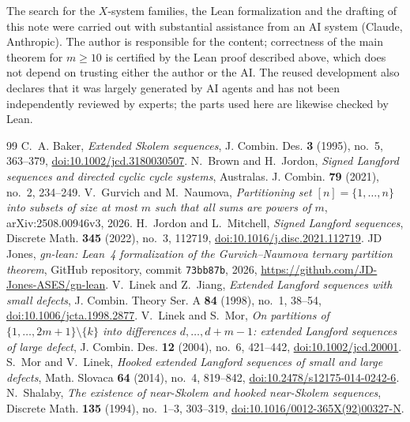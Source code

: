 \documentclass[11pt]{amsart}
\theoremstyle{definition}
\theoremstyle{remark}
\begin{document}
The search for the $X$-system families, the Lean formalization and the drafting of this note were carried out
with substantial assistance from an AI system (Claude, Anthropic). The author is responsible for the
content; correctness of the main theorem for $m\ge10$ is certified by the Lean proof described
above, which does not depend on trusting either the author or the AI. The reused development \cite{Jo} also
declares that it was largely generated by AI agents and has not been independently reviewed by experts; the
parts used here are likewise checked by Lean.

\begin{thebibliography}{99}
 C.~A. Baker, \emph{Extended Skolem sequences}, J. Combin. Des. \textbf{3} (1995), no.~5, 363--379,
\href{https://doi.org/10.1002/jcd.3180030507}{doi:10.1002/jcd.3180030507}.
 N.~Brown and H.~Jordon, \emph{Signed Langford sequences and directed cyclic cycle systems},
Australas. J. Combin. \textbf{79} (2021), no.~2, 234--249.
 V.~Gurvich and M.~Naumova, \emph{Partitioning set $[n]=\{1,\dots,n\}$ into subsets of size at most
$m$ such that all sums are powers of $m$}, arXiv:2508.00946v3, 2026.
 H.~Jordon and L.~Mitchell, \emph{Signed Langford sequences}, Discrete Math. \textbf{345} (2022),
no.~3, 112719, \href{https://doi.org/10.1016/j.disc.2021.112719}{doi:10.1016/j.disc.2021.112719}.
 JD Jones, \emph{gn-lean: Lean~4 formalization of the Gurvich--Naumova ternary partition theorem},
GitHub repository, commit \texttt{73bb87b}, 2026, \url{https://github.com/JD-Jones-ASES/gn-lean}.
 V.~Linek and Z.~Jiang, \emph{Extended Langford sequences with small defects}, J. Combin. Theory
Ser. A \textbf{84} (1998), no.~1, 38--54, \href{https://doi.org/10.1006/jcta.1998.2877}{doi:10.1006/jcta.1998.2877}.
 V.~Linek and S.~Mor, \emph{On partitions of $\{1,\dots,2m+1\}\setminus\{k\}$ into differences
$d,\dots,d+m-1$: extended Langford sequences of large defect}, J. Combin. Des. \textbf{12} (2004), no.~6, 421--442,
\href{https://doi.org/10.1002/jcd.20001}{doi:10.1002/jcd.20001}.
 S.~Mor and V.~Linek, \emph{Hooked extended Langford sequences of small and large defects},
Math. Slovaca \textbf{64} (2014), no.~4, 819--842, \href{https://doi.org/10.2478/s12175-014-0242-6}{doi:10.2478/s12175-014-0242-6}.
 N.~Shalaby, \emph{The existence of near-Skolem and hooked near-Skolem sequences}, Discrete Math.
\textbf{135} (1994), no.~1--3, 303--319, \href{https://doi.org/10.1016/0012-365X(92)00327-N}{doi:10.1016/0012-365X(92)00327-N}.
\end{thebibliography}
\end{document}
